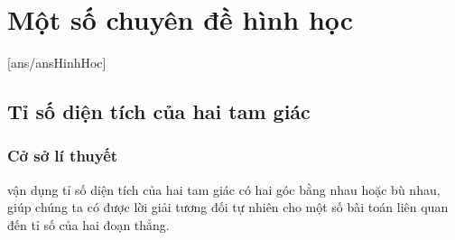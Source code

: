 \chapter{Một số chuyên đề hình học}
[ans/ansHinhHoc]
\section{Tỉ số diện tích của hai tam giác}
\begin{center}
\textbf{\color{violet}{Nguyễn Anh Tuấn\\
(GV THCS Hòa Hiếu 2, TX. Thái Hòa, Nghệ An)}}
\end{center}
\subsection{Cở sở lí thuyết}
 vận dụng tỉ số diện tích của hai tam giác có hai góc bằng nhau hoặc bù nhau, giúp chúng ta có được lời giải tương đối tự nhiên cho một số bài toán liên quan đến tỉ số của hai đoạn thẳng.
